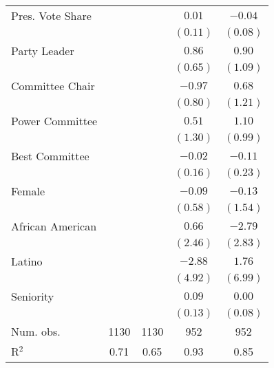 \documentclass[12pt]{article}
\begin{document}
\begin{table}[!htbp]
\begin{threeparttable}
\begin{tabular}{l c c c c }
Pres. Vote Share                  &             &          & $0.01$      & $-0.04$      \\
                                  &             &          & $(0.11)$    & $(0.08)$     \\
Party Leader                      &             &          & $0.86$      & $0.90$       \\
                                  &             &          & $(0.65)$    & $(1.09)$     \\
Committee Chair                   &             &          & $-0.97$     & $0.68$       \\
                                  &             &          & $(0.80)$    & $(1.21)$     \\
Power Committee                   &             &          & $0.51$      & $1.10$       \\
                                  &             &          & $(1.30)$    & $(0.99)$     \\
Best Committee                    &             &          & $-0.02$     & $-0.11$      \\
                                  &             &          & $(0.16)$    & $(0.23)$     \\
Female                            &             &          & $-0.09$     & $-0.13$      \\
                                  &             &          & $(0.58)$    & $(1.54)$     \\
African American                  &             &          & $0.66$      & $-2.79$      \\
                                  &             &          & $(2.46)$    & $(2.83)$     \\
Latino                            &             &          & $-2.88$     & $1.76$       \\
                                  &             &          & $(4.92)$    & $(6.99)$     \\
Seniority                         &             &          & $0.09$      & $0.00$       \\
                                  &             &          & $(0.13)$    & $(0.08)$     \\
\hline
Num. obs.                         & 1130        & 1130     & 952         & 952          \\
R$^2$%
                                  & 0.71        & 0.65     & 0.93        & 0.85         \\

\end{tabular}
\end{threeparttable}
\end{table}
\end{document}
